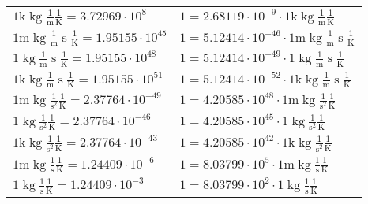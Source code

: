 \begin{center}
\begin{longtable}{l l}
{\color{gray}$1 \bm{\mathrm{ k}}\operatorname{kg}\frac1{\operatorname{m}}{}{}\frac1{\operatorname{K}} = 3.72969\cdot10^{8} $}   & {\color{gray}$ 1 = 2.68119\cdot10^{-9} \cdot 1 \bm{\mathrm{ k}}\operatorname{kg}\frac1{\operatorname{m}}{}{}\frac1{\operatorname{K}}$}  \\
{\color{gray}$1 \bm{\mathrm{ m}}\operatorname{kg}\frac1{\operatorname{m}}{\operatorname{s}}{}\frac1{\operatorname{K}} = 1.95155\cdot10^{45} $}   & {\color{gray}$ 1 = 5.12414\cdot10^{-46} \cdot 1 \bm{\mathrm{ m}}\operatorname{kg}\frac1{\operatorname{m}}{\operatorname{s}}{}\frac1{\operatorname{K}}$}  \\
{\color{black}$1 \bm{\mathrm{ }}\operatorname{kg}\frac1{\operatorname{m}}{\operatorname{s}}{}\frac1{\operatorname{K}} = 1.95155\cdot10^{48} $}   & {\color{black}$ 1 = 5.12414\cdot10^{-49} \cdot 1 \bm{\mathrm{ }}\operatorname{kg}\frac1{\operatorname{m}}{\operatorname{s}}{}\frac1{\operatorname{K}}$}  \\
{\color{gray}$1 \bm{\mathrm{ k}}\operatorname{kg}\frac1{\operatorname{m}}{\operatorname{s}}{}\frac1{\operatorname{K}} = 1.95155\cdot10^{51} $}   & {\color{gray}$ 1 = 5.12414\cdot10^{-52} \cdot 1 \bm{\mathrm{ k}}\operatorname{kg}\frac1{\operatorname{m}}{\operatorname{s}}{}\frac1{\operatorname{K}}$}  \\
{\color{gray}$1 \bm{\mathrm{ m}}\operatorname{kg}{}\frac1{\operatorname{s}^2}{}\frac1{\operatorname{K}} = 2.37764\cdot10^{-49} $}   & {\color{gray}$ 1 = 4.20585\cdot10^{48} \cdot 1 \bm{\mathrm{ m}}\operatorname{kg}{}\frac1{\operatorname{s}^2}{}\frac1{\operatorname{K}}$}  \\
{\color{black}$1 \bm{\mathrm{ }}\operatorname{kg}{}\frac1{\operatorname{s}^2}{}\frac1{\operatorname{K}} = 2.37764\cdot10^{-46} $}   & {\color{black}$ 1 = 4.20585\cdot10^{45} \cdot 1 \bm{\mathrm{ }}\operatorname{kg}{}\frac1{\operatorname{s}^2}{}\frac1{\operatorname{K}}$}  \\
{\color{gray}$1 \bm{\mathrm{ k}}\operatorname{kg}{}\frac1{\operatorname{s}^2}{}\frac1{\operatorname{K}} = 2.37764\cdot10^{-43} $}   & {\color{gray}$ 1 = 4.20585\cdot10^{42} \cdot 1 \bm{\mathrm{ k}}\operatorname{kg}{}\frac1{\operatorname{s}^2}{}\frac1{\operatorname{K}}$}  \\
{\color{gray}$1 \bm{\mathrm{ m}}\operatorname{kg}{}\frac1{\operatorname{s}}{}\frac1{\operatorname{K}} = 1.24409\cdot10^{-6} $}   & {\color{gray}$ 1 = 8.03799\cdot10^{5} \cdot 1 \bm{\mathrm{ m}}\operatorname{kg}{}\frac1{\operatorname{s}}{}\frac1{\operatorname{K}}$}  \\
{\color{black}$1 \bm{\mathrm{ }}\operatorname{kg}{}\frac1{\operatorname{s}}{}\frac1{\operatorname{K}} = 1.24409\cdot10^{-3} $}   & {\color{black}$ 1 = 8.03799\cdot10^{2} \cdot 1 \bm{\mathrm{ }}\operatorname{kg}{}\frac1{\operatorname{s}}{}\frac1{\operatorname{K}}$}  \\

\end{longtable}
\end{center}
